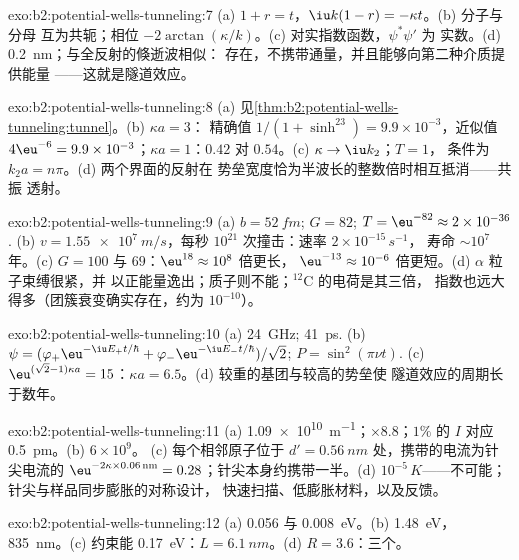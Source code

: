 \begin{solution}{exo:b2:potential-wells-tunneling:7}
(a) $1 + r = t$，$\iu k(1 - r) = -\kappa t$。(b) 分子与分母
互为共轭；相位 $-2\arctan(\kappa/k)$。(c) 对实指数函数，$\psi^*\psi'$ 为
实数。(d) \qty{0.2}{nm}；与全反射的倏逝波相似：
存在，不携带通量，并且能够向第二种介质提供能量
——这就是隧道效应。
\end{solution}

\begin{solution}{exo:b2:potential-wells-tunneling:8}
(a) 见\cref{thm:b2:potential-wells-tunneling:tunnel}。(b) $\kappa a = 3$：
精确值 $1/(1 + \sinh^23) = 9.9 \times 10^{-3}$，近似值 $4\eu^{-6} = 9.9 \times
10^{-3}$；$\kappa a = 1$：$0.42$ 对 $0.54$。(c) $\kappa \to \iu k_2$；$T = 1$，
条件为 $k_2a = n\pi$。(d) 两个界面的反射在
势垒宽度恰为半波长的整数倍时相互抵消——共振
透射。
\end{solution}

\begin{solution}{exo:b2:potential-wells-tunneling:9}
(a) $b = \qty{52}{fm}$; $G = 82$; $T = \eu^{-82} \approx 2 \times 10^{-36}$. (b) $v =
\qty{1.55e7}{m/s}$，每秒 $10^{21}$ 次撞击：速率 $2 \times 10^{-15}\,\unit{s^{-1}}$，
寿命 $\sim 10^7$ 年。(c) $G = 100$ 与 $69$：$\eu^{18} \approx 10^8$ 倍更长，
$\eu^{-13} \approx 10^{-6}$ 倍更短。(d) $\alpha$ 粒子束缚很紧，并
以正能量逸出；质子则不能；$^{12}$C 的电荷是其三倍，
指数也远大得多（团簇衰变确实存在，约为 $10^{-10}$）。
\end{solution}

\begin{solution}{exo:b2:potential-wells-tunneling:10}
(a) \qty{24}{GHz}; \qty{41}{ps}. (b) $\psi = (\varphi_+\eu^{-\iu E_+t/\hbar} +
\varphi_-\eu^{-\iu E_-t/\hbar})/\sqrt2$; $P = \sin^2(\pi\nu t)$. (c) $\eu^{(\sqrt2 - 1)
\kappa a} = 15$：$\kappa a = 6.5$。(d) 较重的基团与较高的势垒使
隧道效应的周期长于数年。
\end{solution}

\begin{solution}{exo:b2:potential-wells-tunneling:11}
(a) \qty{1.09e10}{m^{-1}}；$\times 8.8$；$1\%$ 的 $I$ 对应 \qty{0.5}{pm}。(b) $6 \times 10^9$。
(c) 每个相邻原子位于 $d' = \qty{0.56}{nm}$ 处，携带的电流为针尖电流的 $\eu^{-2\kappa \times 0.06\,\text{nm}}
= 0.28$；针尖本身约携带一半。(d)
$10^{-5}\,\unit{K}$——不可能；针尖与样品同步膨胀的对称设计，
快速扫描、低膨胀材料，以及反馈。
\end{solution}

\begin{solution}{exo:b2:potential-wells-tunneling:12}
(a) \qty{0.056}{} 与 \qty{0.008}{eV}。(b) \qty{1.48}{eV}，\qty{835}{nm}。(c) 约束能
\qty{0.17}{eV}：$L = \qty{6.1}{nm}$。(d) $R = 3.6$：三个。
\end{solution}

